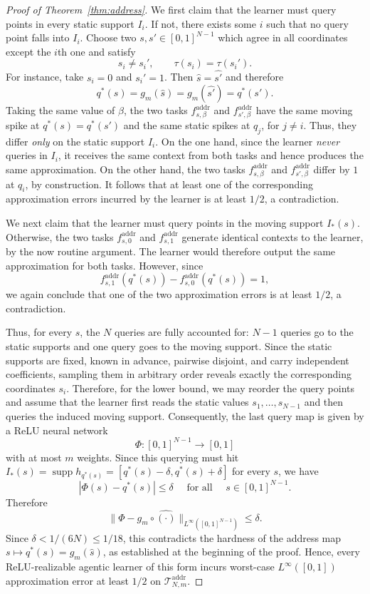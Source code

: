 \documentclass{article}
\begin{document}
\begin{proof}[Proof of Theorem~\ref{thm:address}]
We first claim that the learner must query points in every static support \(I_i\). 
If not, there exists some \(i\) such that no query point falls into \(I_i\). Choose two \(s,s'\in[0,1]^{N-1}\) which agree in all coordinates except the \(i\)th one and satisfy
\[
s_i\neq s_i',
\qquad
\tau(s_i)=\tau(s_i').
\]
For instance, take \(s_i=0\) and \(s_i'=1\). Then $\widehat s=\widehat{s'}$ and therefore
\[
q^\ast(s)=g_m(\widehat s)= g_m(\widehat{s'})=q^\ast(s').
\]
Taking the same value of \(\beta\), the two tasks
\(f^{\mathrm{addr}}_{s,\beta}\) and \(f^{\mathrm{addr}}_{s',\beta}\)
have the same moving spike at $q^\ast(s)=q^\ast(s')$ and the same static spikes at $q_j$, for $j\neq i$.
Thus, they differ \emph{only} on the static support \(I_i\).
On the one hand, since the learner \emph{never} queries in \(I_i\), it receives the same %
context from both tasks and hence produces the same approximation. 
On the other hand, the two tasks \(f^{\mathrm{addr}}_{s,\beta}\) and \(f^{\mathrm{addr}}_{s',\beta}\) differ by \(1\) at \(q_i\), by construction.
It follows that at least one of the corresponding approximation errors incurred by the learner is at least \(1/2\), a contradiction.

We next claim that the learner must query points in the moving support \(I_*(s)\). Otherwise, the two tasks \(f^{\mathrm{addr}}_{s,0}\) and \(f^{\mathrm{addr}}_{s,1}\) generate identical 
contexts to the learner, by the now routine argument. %
The learner would therefore output the same approximation for both tasks. However, since
\[
f^{\mathrm{addr}}_{s,1}(q^\ast(s))
-
f^{\mathrm{addr}}_{s,0}(q^\ast(s))
=
1,
\]
we again conclude that one of the two approximation errors is at least \(1/2\), a contradiction.

Thus, for every \(s\), the \(N\) queries are fully accounted for: \(N-1\) queries go to the static supports and one query goes to the moving support. Since the static supports are fixed, known in advance, pairwise disjoint, and carry independent coefficients, sampling them in arbitrary order reveals exactly the corresponding coordinates \(s_i\).
Therefore, for the lower bound, we may reorder the query points and assume that the learner first reads the static values \(s_1,\dots,s_{N-1}\) and then queries the induced moving support. %
Consequently, the last %
query map is given by a ReLU neural network
\[
\Phi:[0,1]^{N-1}\to[0,1]
\]
with at most \(m\) weights. Since this querying must hit $I_*(s)=\operatorname{supp}h_{q^\ast(s)} = [q^\ast(s)-\delta, q^\ast(s)+\delta]$
for every \(s\), we have
\[
|\Phi(s)-q^\ast(s)|\leq \delta
\quad
\text{ for all }\quad s\in[0,1]^{N-1}.
\]
Therefore
\[
\|\Phi-g_m\circ \widehat{(\cdot)}\|_{L^\infty([0,1]^{N-1})}
\leq \delta.
\]
Since $\delta<1/(6N)\leq 1/18$, this contradicts the hardness of the address map $s\mapsto q^\ast(s)=g_m(\widehat s)$, as established at the beginning of the proof. Hence, every ReLU-realizable agentic learner of this form incurs worst-case \(L^\infty([0,1])\) approximation error at least \(1/2\) on $\mathcal T_{N,m}^{\mathrm{addr}}$.


\end{proof}
\end{document}
